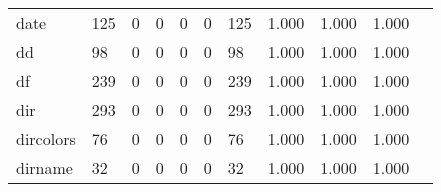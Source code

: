 \begin{longtable}{lp{1.2cm}p{1.2cm}p{1.2cm}p{1.2cm}p{1.2cm}p{1.2cm}p{1.2cm}p{1.2cm}p{1.2cm}p{1.2cm}}
date      &                                   125 &                                                  0 &                                                  0 &                                                  0 &                                                  0 &                                                125 &                                              1.000 &                                              1.000 &                                              1.000 \\
dd        &                                    98 &                                                  0 &                                                  0 &                                                  0 &                                                  0 &                                                 98 &                                              1.000 &                                              1.000 &                                              1.000 \\
df        &                                   239 &                                                  0 &                                                  0 &                                                  0 &                                                  0 &                                                239 &                                              1.000 &                                              1.000 &                                              1.000 \\
dir       &                                   293 &                                                  0 &                                                  0 &                                                  0 &                                                  0 &                                                293 &                                              1.000 &                                              1.000 &                                              1.000 \\
dircolors &                                    76 &                                                  0 &                                                  0 &                                                  0 &                                                  0 &                                                 76 &                                              1.000 &                                              1.000 &                                              1.000 \\
dirname   &                                    32 &                                                  0 &                                                  0 &                                                  0 &                                                  0 &                                                 32 &                                              1.000 &                                              1.000 &                                              1.000 \\

\end{longtable}
